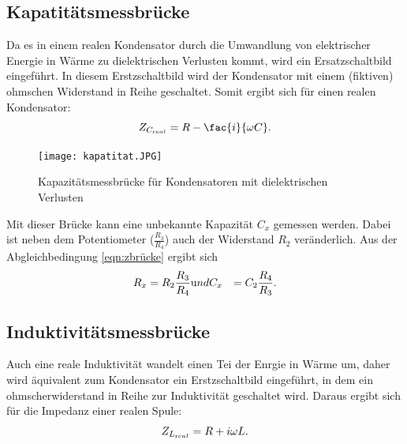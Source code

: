 \subsection{Kapatitätsmessbrücke}
Da es in einem realen Kondensator durch die Umwandlung von elektrischer Energie in
Wärme zu dielektrischen Verlusten kommt, wird ein Ersatzschaltbild eingeführt.
In diesem Erstzschaltbild wird der Kondensator mit einem (fiktiven) ohmschen Widerstand
in Reihe geschaltet. Somit ergibt sich für einen realen Kondensator:
\begin{equation*}
  Z_{C_{\text real}}=R-\fac{i}{\omega C}.
  \label{eqn:zcreal}
\end{equation*}
\begin{figure}[H]
  \texttt{[image: kapatitat.JPG]}
  \caption{Kapazitätsmessbrücke für Kondensatoren mit dielektrischen Verlusten}
  \label{fig:kapazitat}
  \cite{skript}
\end{figure}
Mit dieser Brücke kann eine unbekannte Kapazität $C_{x}$ gemessen werden.
Dabei ist neben dem Potentiometer ($\frac{R_{3}}{R_{4}}$) auch der Widerstand
$R_{2}$ veränderlich.
Aus der Abgleichbedingung \ref{eqn:zbrücke} ergibt sich
\begin{align}
  R_{x} &=R_{2}\frac{R_{3}}{R_{4}} \text und
  C_{x} &=C_{2}\frac{R_{4}}{R_{3}}.
\end{align}

\subsection{Induktivitätsmessbrücke}
 Auch eine reale Induktivität wandelt einen Tei der Enrgie in Wärme um, daher wird äquivalent
 zum Kondensator ein Erstzschaltbild eingeführt, in dem ein ohmscherwiderstand in Reihe
 zur Induktivität geschaltet wird.
 Daraus ergibt sich für die Impedanz einer realen Spule:
 \begin{equation}
   Z_{L_{\text real}}= R + i\omega L.
   \label{zlreal}
 \end{equation}

